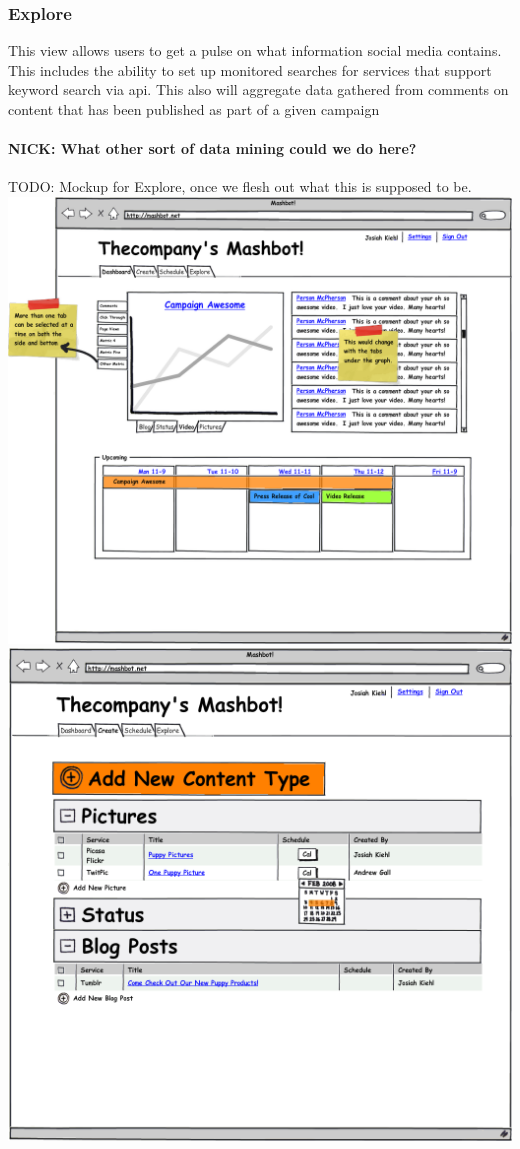 \documentclass{report}
\begin{document}
        \subsubsection{Explore}
        This view allows users to get a pulse on what information social media contains.  This includes the ability to set up monitored searches for services that support keyword search via api.  This also will aggregate data gathered from comments on content that has been published as part of a given campaign
        \paragraph{NICK: What other sort of data mining could we do here?}
        TODO: Mockup for Explore, once we flesh out what this is supposed to be.
        \clearpage
        \includegraphics[width=7.5in]{../mockups/dashboard.png}
        \clearpage
        \includegraphics[width=7.5in]{../mockups/create.png}
\end{document}
